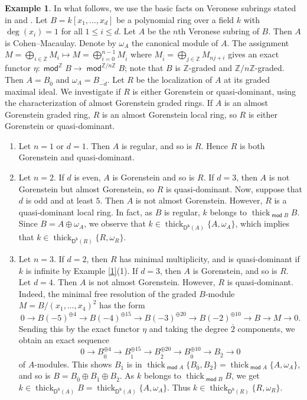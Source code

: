 \documentclass{amsart}
\theoremstyle{definition}
\newtheorem{eg}[thm]{Example}
\theoremstyle{remark}
\numberwithin{equation}{thm}
\def\Db{\operatorname{\mathsf{D^b}}}
\def\le{\leqslant}
\def\mod{\operatorname{\mathsf{mod}}}
\def\thick{\operatorname{thick}}
\def\ZZ{\mathbb{Z}}
\begin{document}
\begin{eg}\label{vrns}
In what follows, we use the basic facts on Veronese subrings stated in \cite[Chapter 3]{GW78} and \cite[Exercise 3.6.21]{BH}.
Let $B=k[x_1,\ldots, x_d]$ be a polynomial ring over a field $k$ with $\deg(x_i)=1$ for all $1\le i\le d$.
Let $A$ be the $n$th Veronese subring of $B$.
Then $A$ is Cohen--Macaulay.
Denote by $\omega_A$ the canonical module of $A$.
The assignment $M=\bigoplus_{i\in\ZZ}M_i\mapsto M=\bigoplus_{i=0}^{n-1}M_{\overline{i}}$ where $M_{\overline{i}}=\bigoplus_{j\in\ZZ} M_{nj+i}$ gives an exact functor $\eta:\mod^\ZZ B\to\mod^{\ZZ/n\ZZ}B$; note that $B$ is $\ZZ$-graded and $\ZZ/n\ZZ$-graded.
Then $A=B_{\overline{0}}$ and $\omega_A=B_{\overline{-d}}$.
Let $R$ be the localization of $A$ at its graded maximal ideal.
We investigate if $R$ is either Gorenstein or quasi-dominant, using the characterization \cite[Example 10.8]{GTT15} of almost Gorenstein graded rings.
If $A$ is an almost Gorenstein graded ring, $R$ is an almost Gorenstein local ring, so $R$ is either Gorenstein or quasi-dominant.
\begin{enumerate}[(1)]
\item
Let $n=1$ or $d=1$.
Then $A$ is regular, and so is $R$.
Hence $R$ is both Gorenstein and quasi-dominant.
\item
Let $n=2$.
If $d$ is even, $A$ is Gorenstein and so is $R$.
If $d=3$, then $A$ is not Gorenstein but almost Gorenstein, so $R$ is quasi-dominant.
Now, suppose that $d$ is odd and at least $5$.
Then $A$ is not almost Gorenstein.
However, $R$ is a quasi-dominant local ring.
In fact, as $B$ is regular, $k$ belongs to $\thick_{\mod B}B$.
Since $B=A\oplus\omega_A$, we observe that $k\in\thick_{\Db(A)}\{A, \omega_A\}$, which implies that $k\in\thick_{\Db(R)}\{R,\omega_R\}$.
\item
Let $n=3$.
If $d=2$, then $R$ has minimal multiplicity, and is quasi-dominant if $k$ is infinite by Example \ref{1}(1).
If $d=3$, then $A$ is Gorenstein, and so is $R$.
Let $d=4$.
Then $A$ is not almost Gorenstein.
However, $R$ is quasi-dominant.
Indeed, the minimal free resolution of the graded $B$-module $M=B/(x_1,\dots,x_4)^2$ has the form
$$
0 \to B(-5)^{\oplus 4}\to B(-4)^{\oplus 15}\to B(-3)^{\oplus 20}\to B(-2)^{\oplus 10}\to B\to M\to 0.
$$
Sending this by the exact functor $\eta$ and taking the degree $\overline2$ components, we obtain an exact sequence 
$$
0 \to B_{\overline{0}}^{\oplus 4}\to B_{\overline{1}}^{\oplus 15}\to B_{\overline{2}}^{\oplus 20}\to B_{\overline{0}}^{\oplus 10}\to B_{\overline{2}}\to 0
$$
of $A$-modules.
This shows $B_{\overline{1}}$ is in $\thick_{\mod A}\{B_{\overline0}, B_{\overline{2}}\}=\thick_{\mod A}\{A, \omega_A\}$, and so is $B=B_{\overline{0}}\oplus B_{\overline{1}}\oplus B_{\overline{2}}$.
As $k$ belongs to $\thick_{\mod B}B$, we get $k\in \thick_{\Db(A)}B=\thick_{\Db(A)}\{A, \omega_A\}$.
Thus $k\in\thick_{\Db(R)}\{R,\omega_R\}$.
\end{enumerate}
\end{eg}
\end{document}

